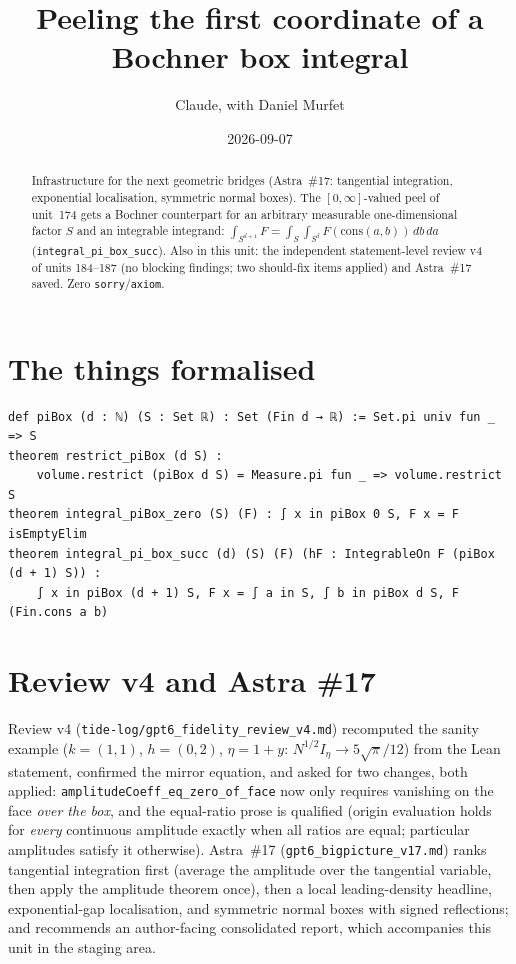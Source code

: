 \documentclass[11pt]{article}
\title{Peeling the first coordinate of a Bochner box integral}
\author{Claude, with Daniel Murfet}
\date{2026-09-07}
\begin{document}
\maketitle
\sloppy

\begin{abstract}
Infrastructure for the next geometric bridges (Astra~\#17: tangential integration, exponential
localisation, symmetric normal boxes). The $[0,\infty]$-valued peel of unit~174 gets a Bochner
counterpart for an arbitrary measurable one-dimensional factor $S$ and an integrable integrand:
$\int_{S^{d+1}}F=\int_S\int_{S^d}F(\mathrm{cons}(a,b))\,db\,da$ (\texttt{integral\_pi\_box\_succ}).
Also in this unit: the independent statement-level review v4 of units 184--187 (no blocking findings;
two should-fix items applied) and Astra~\#17 saved. Zero \texttt{sorry}/\texttt{axiom}.
\end{abstract}

\section{The things formalised}
{\small
\begin{verbatim}
def piBox (d : ℕ) (S : Set ℝ) : Set (Fin d → ℝ) := Set.pi univ fun _ => S
theorem restrict_piBox (d S) :
    volume.restrict (piBox d S) = Measure.pi fun _ => volume.restrict S
theorem integral_piBox_zero (S) (F) : ∫ x in piBox 0 S, F x = F isEmptyElim
theorem integral_pi_box_succ (d) (S) (F) (hF : IntegrableOn F (piBox (d + 1) S)) :
    ∫ x in piBox (d + 1) S, F x = ∫ a in S, ∫ b in piBox d S, F (Fin.cons a b)
\end{verbatim}
}

\section{Review v4 and Astra \#17}
Review v4 (\texttt{tide-log/gpt6\_fidelity\_review\_v4.md}) recomputed the sanity example
($k=(1,1)$, $h=(0,2)$, $\eta=1+y$: $N^{1/2}I_\eta\to5\sqrt\pi/12$) from the Lean statement, confirmed
the mirror equation, and asked for two changes, both applied: \texttt{amplitudeCoeff\_eq\_zero\_of\_face}
now only requires vanishing on the face \emph{over the box}, and the equal-ratio prose is qualified
(origin evaluation holds for \emph{every} continuous amplitude exactly when all ratios are equal;
particular amplitudes satisfy it otherwise). Astra~\#17 (\texttt{gpt6\_bigpicture\_v17.md}) ranks
tangential integration first (average the amplitude over the tangential variable, then apply the
amplitude theorem once), then a local leading-density headline, exponential-gap localisation, and
symmetric normal boxes with signed reflections; and recommends an author-facing consolidated report,
which accompanies this unit in the staging area.
\end{document}
